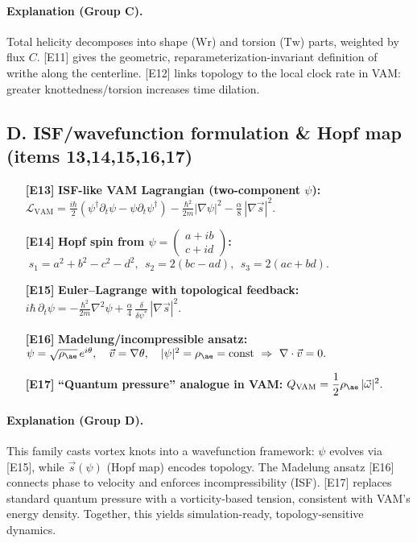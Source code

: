 \documentclass[11pt]{article}
\begin{document}
    \paragraph{Explanation (Group C).}
    Total helicity decomposes into shape (\(\mathrm{Wr}\)) and torsion (\(\mathrm{Tw}\)) parts, weighted by flux \(C\).
    [E11] gives the geometric, reparameterization-invariant definition of writhe along the centerline.
    [E12] links topology to the local clock rate in VAM: greater knottedness/torsion increases time dilation.

    \subsection{D. ISF/wavefunction formulation \& Hopf map (items 13,14,15,16,17)}
    \begin{enumerate}
        \item[\textbf{[E13]}] \textbf{ISF-like VAM Lagrangian (two-component \(\psi\)):}\quad
        \(\displaystyle
        \mathcal{L}_\text{VAM}=\frac{i\hbar}{2}\!\left(\psi^\dagger \partial_t\psi-\psi\partial_t\psi^\dagger\right)
        -\frac{\hbar^2}{2m}|\nabla\psi|^2-\frac{\alpha}{8}\,|\nabla\vec s|^2.
        \)
        \item[\textbf{[E14]}] \textbf{Hopf spin from \(\psi=\begin{pmatrix}a+ib\\ c+id\end{pmatrix}\):}\quad
        \(\;s_1=a^2+b^2-c^2-d^2,\ \ s_2=2(bc-ad),\ \ s_3=2(ac+bd).\)
        \item[\textbf{[E15]}] \textbf{Euler–Lagrange with topological feedback:}\quad
        \(\displaystyle i\hbar\,\partial_t\psi=-\frac{\hbar^2}{2m}\nabla^2\psi+\frac{\alpha}{4}\,\frac{\delta}{\delta\psi^*}\,|\nabla\vec s|^2.\)
        \item[\textbf{[E16]}] \textbf{Madelung/incompressible ansatz:}\quad
        \(\psi=\sqrt{\rho_{\ae}}\,e^{i\theta},\quad \vec v=\nabla\theta,\quad |\psi|^2=\rho_{\ae}=\text{const}\ \Rightarrow\ \nabla\cdot\vec v=0.\)
        \item[\textbf{[E17]}] \textbf{``Quantum pressure'' analogue in VAM:}\quad
        \(\displaystyle Q_{\text{VAM}}=\frac{1}{2}\rho_{\ae}\,|\vec\omega|^2.\)
    \end{enumerate}

    \paragraph{Explanation (Group D).}
    This family casts vortex knots into a wavefunction framework: \(\psi\) evolves via [E15], while \(\vec s(\psi)\) (Hopf map) encodes topology.
    The Madelung ansatz [E16] connects phase to velocity and enforces incompressibility (ISF).
    [E17] replaces standard quantum pressure with a vorticity-based tension, consistent with VAM’s energy density.
    Together, this yields simulation-ready, topology-sensitive dynamics.
\end{document}

